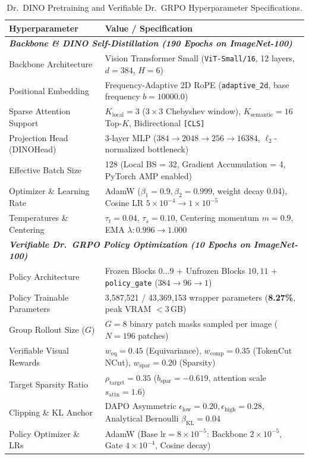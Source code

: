 \documentclass[11pt,a4paper]{article}
\begin{document}
\begin{table}[ht]
\centering
\small
\caption{Dr.\ DINO Pretraining and Verifiable Dr.\ GRPO Hyperparameter Specifications.}
\label{tab:hyperparams}
\begin{tabularx}{\columnwidth}{lX}
\toprule
\textbf{Hyperparameter} & \textbf{Value / Specification} \\
\midrule
\multicolumn{2}{l}{\textit{\textbf{Backbone \& DINO Self-Distillation (190 Epochs on ImageNet-100)}}} \\
Backbone Architecture & Vision Transformer Small (\texttt{ViT-Small/16}, 12 layers, $d=384$, $H=6$) \\
Positional Embedding & Frequency-Adaptive 2D RoPE (\texttt{adaptive\_2d}, base frequency $b=10000.0$) \\
Sparse Attention Support & $K_{\text{local}} = 3$ ($3\times 3$ Chebyshev window), $K_{\text{semantic}} = 16$ Top-$K$, Bidirectional \texttt{[CLS]} \\
Projection Head (DINOHead) & 3-layer MLP ($384 \to 2048 \to 256 \to 16384$, $\ell_2$-normalized bottleneck) \\
Effective Batch Size & 128 (Local BS = 32, Gradient Accumulation = 4, PyTorch AMP enabled) \\
Optimizer \& Learning Rate & AdamW ($\beta_1=0.9, \beta_2=0.999$, weight decay 0.04), Cosine LR $5\times 10^{-4} \to 1\times 10^{-5}$ \\
Temperatures \& Centering & $\tau_t = 0.04$, $\tau_s = 0.10$, Centering momentum $m=0.9$, EMA $\lambda: 0.996 \to 1.000$ \\
\midrule
\multicolumn{2}{l}{\textit{\textbf{Verifiable Dr.\ GRPO Policy Optimization (10 Epochs on ImageNet-100)}}} \\
Policy Architecture & Frozen Blocks $0\dots 9$ + Unfrozen Blocks $10, 11$ + \texttt{policy\_gate} ($384\to 96\to 1$) \\
Policy Trainable Parameters & 3,587,521 / 43,369,153 wrapper parameters (\textbf{8.27\%}, peak VRAM $<3$\,GB) \\
Group Rollout Size ($G$) & $G = 8$ binary patch masks sampled per image ($N=196$ patches) \\
Verifiable Visual Rewards & $w_{\text{eq}}=0.45$ (Equivariance), $w_{\text{comp}}=0.35$ (TokenCut NCut), $w_{\text{spar}}=0.20$ (Sparsity) \\
Target Sparsity Ratio & $\rho_{\text{target}} = 0.35$ ($b_{\text{spar}} = -0.619$, attention scale $s_{\text{attn}} = 1.6$) \\
Clipping \& KL Anchor & DAPO Asymmetric $\epsilon_{\text{low}} = 0.20, \epsilon_{\text{high}} = 0.28$, Analytical Bernoulli $\beta_{\text{KL}} = 0.04$ \\
Policy Optimizer \& LRs & AdamW (Base $\text{lr}=8\times 10^{-5}$: Backbone $2\times 10^{-5}$, Gate $4\times 10^{-4}$, Cosine decay) \\
\bottomrule
\end{tabularx}
\end{table}
\end{document}
